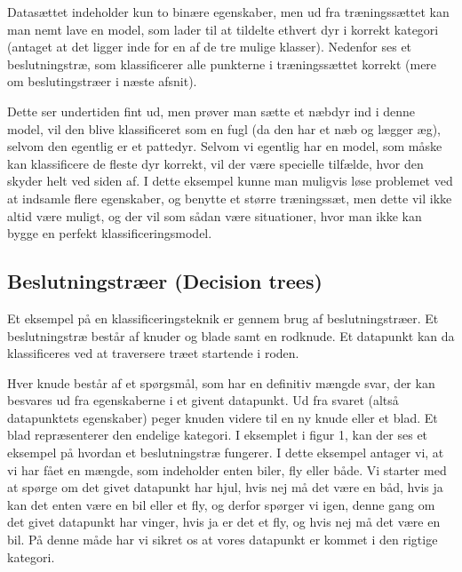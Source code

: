 \documentclass{article}
\begin{document}
Datasættet indeholder kun to binære egenskaber, men ud fra træningssættet kan man nemt lave en model, som lader til at tildelte ethvert dyr i korrekt kategori (antaget at det ligger inde for en af de tre mulige klasser). Nedenfor ses et beslutningstræ, som klassificerer alle punkterne i træningssættet korrekt (mere om beslutingstræer i næste afsnit).

\begin{center}
\end{center}
Dette ser undertiden fint ud, men prøver man sætte et næbdyr ind i denne model, vil den blive klassificeret som en fugl (da den har et næb og lægger æg), selvom den egentlig er et pattedyr. Selvom vi egentlig har en model, som måske kan klassificere de fleste dyr korrekt, vil der være specielle tilfælde, hvor den skyder helt ved siden af. I dette eksempel kunne man muligvis løse problemet ved at indsamle flere egenskaber, og benytte et større træningssæt, men dette vil ikke altid være muligt, og der vil som sådan være situationer, hvor man ikke kan bygge en perfekt klassificeringsmodel.


\subsection{Beslutningstræer (Decision trees)}
Et eksempel på en klassificeringsteknik er gennem brug af beslutningstræer. Et beslutningstræ består af knuder og blade samt en rodknude. Et datapunkt kan da klassificeres ved at traversere træet startende i roden.

Hver knude består af et spørgsmål, som har en definitiv mængde svar, der kan besvares ud fra egenskaberne i et givent datapunkt. Ud fra svaret (altså datapunktets egenskaber) peger knuden videre til en ny knude eller et blad. Et blad repræsenterer den endelige kategori. I eksemplet i figur 1, kan der ses et eksempel på hvordan et beslutningstræ fungerer. I dette eksempel antager vi, at vi har fået en mængde, som indeholder enten biler, fly eller både. Vi starter med at spørge om det givet datapunkt har hjul, hvis nej må det være en båd, hvis ja kan det enten være en bil eller et fly, og derfor spørger vi igen, denne gang om det givet datapunkt har vinger, hvis ja er det et fly, og hvis nej må det være en bil. På denne måde har vi sikret os at vores datapunkt er kommet i den rigtige kategori.
\end{document}
